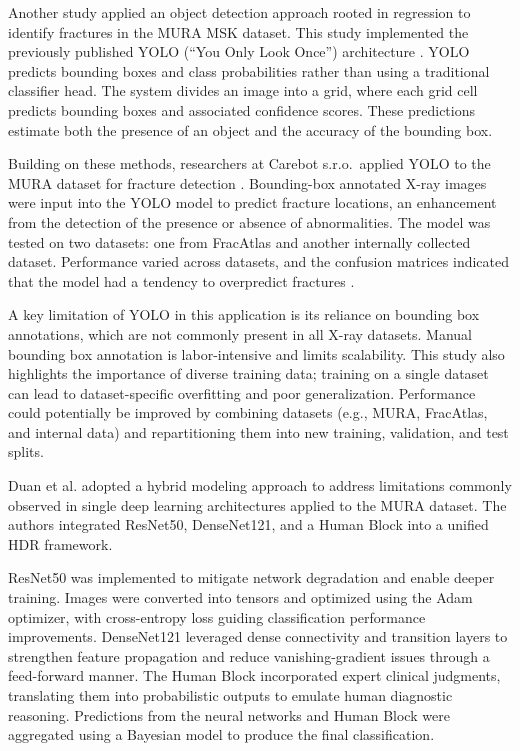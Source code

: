 \documentclass[conference]{IEEEtran}
\begin{document}
Another study applied an object detection approach rooted in regression to identify fractures in the MURA MSK dataset. This study implemented the previously published YOLO (``You Only Look Once'') architecture \cite{Redmon2016YOLO}. YOLO predicts bounding boxes and class probabilities rather than using a traditional classifier head. The system divides an image into a grid, where each grid cell predicts bounding boxes and associated confidence scores. These predictions estimate both the presence of an object and the accuracy of the bounding box.

Building on these methods, researchers at Carebot s.r.o.\ applied YOLO to the MURA dataset for fracture detection \cite{Hruby2024_cross_center_medrxiv}. Bounding-box annotated X-ray images were input into the YOLO model to predict fracture locations, an enhancement from the detection of the presence or absence of abnormalities. The model was tested on two datasets: one from FracAtlas and another internally collected dataset. Performance varied across datasets, and the confusion matrices indicated that the model had a tendency to overpredict fractures \cite{Hruby2024_cross_center_medrxiv}.

A key limitation of YOLO in this application is its reliance on bounding box annotations, which are not commonly present in all X-ray datasets. Manual bounding box annotation is labor-intensive and limits scalability. This study also highlights the importance of diverse training data; training on a single dataset can lead to dataset-specific overfitting and poor generalization. Performance could potentially be improved by combining datasets (e.g., MURA, FracAtlas, and internal data) and repartitioning them into new training, validation, and test splits.

Duan et al. \cite{liu2022convnet2020s} adopted a hybrid modeling approach to address limitations commonly observed in single deep learning architectures applied to the MURA dataset. The authors integrated ResNet50, DenseNet121, and a Human Block into a unified HDR framework.

ResNet50 was implemented to mitigate network degradation and enable deeper training. Images were converted into tensors and optimized using the Adam optimizer, with cross-entropy loss guiding classification performance improvements. DenseNet121 leveraged dense connectivity and transition layers to strengthen feature propagation and reduce vanishing-gradient issues through a feed-forward manner. The Human Block incorporated expert clinical judgments, translating them into probabilistic outputs to emulate human diagnostic reasoning. Predictions from the neural networks and Human Block were aggregated using a Bayesian model to produce the final classification.
\end{document}
